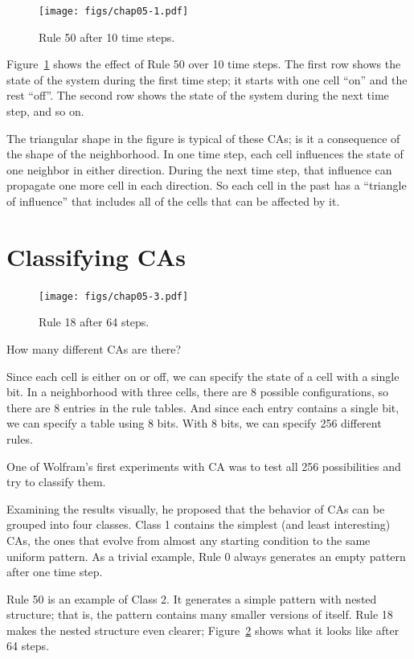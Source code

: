 \documentclass[12pt]{book}
\theoremstyle{exercise}
\begin{document}
\begin{figure}
\centerline{\texttt{[image: figs/chap05-1.pdf]}}
\caption{Rule 50 after 10 time steps.}
\label{chap05-1}
\end{figure}

Figure~\ref{chap05-1} shows the effect of Rule 50 over 10
time steps.  The first row shows the state of the system during the first
time step; it starts with one cell ``on'' and the rest ``off''.
The second row shows the state of the system during the
next time step, and so on.

The triangular shape in the figure is typical of these CAs; is it a
consequence of the shape of the neighborhood.  In one time step, each
cell influences the state of one neighbor in either direction.  During
the next time step, that influence can propagate one more cell in each
direction.  So each cell in the past has a ``triangle of influence''
that includes all of the cells that can be affected by it.


\section{Classifying CAs}

\begin{figure}
\centerline{\texttt{[image: figs/chap05-3.pdf]}}
\caption{Rule 18 after 64 steps.}
\label{chap05-3}
\end{figure}

How many different CAs are there?

Since each cell is either on or off, we can specify the state
of a cell with a single bit.  In a neighborhood with three cells,
there are 8 possible configurations, so there are 8 entries
in the rule tables.  And since each entry contains a single bit,
we can specify a table using 8 bits.  With 8 bits, we can
specify 256 different rules.

One of Wolfram's first experiments with CA was to test all 256
possibilities and try to classify them.

Examining the results visually, he proposed that the behavior of CAs
can be grouped into four classes.  Class 1 contains the simplest (and
least interesting) CAs, the ones that evolve from almost any starting
condition to the same uniform pattern.  As a trivial example, Rule 0
always generates an empty pattern after one time step.


Rule 50 is an example of Class 2.  It generates a simple pattern with
nested structure; that is, the pattern contains many smaller versions
of itself.  Rule 18 makes the nested structure even clearer;
Figure~\ref{chap05-3} shows what it looks like after 64 steps.
\end{document}
